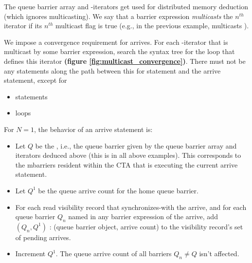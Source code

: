 The queue barrier array and -iterators get used for distributed memory deduction (which ignores multicasting).
We say that a barrier expression \textit{multicasts} the $n^{th}$ iterator if its $n^{th}$ multicast flag is true (e.g., in the previous example,  multicasts ).

\begin{figure*}[!b]

\caption{Illustration of mbarrier multicast convergence requirements} \label{fig:multicast_convergence}
\end{figure*}

\filbreak
{}

We impose a convergence requirement for arrives.
For each -iterator that is multicast by some barrier expression, search the syntax tree for the  loop that defines this iterator \textbf{(figure \ref{fig:multicast_convergence})}.
There must not be any statements along the path between this for statement and the arrive statement, except for
\begin{itemize}
  \item {} statements
  \filbreak
  \item {} loops
\end{itemize}

\filbreak
For $N=1$, the behavior of an arrive statement is:
\begin{itemize}
  \item Let $Q$ be the , i.e., the queue barrier given by the queue barrier array and iterators deduced above (this is  in all above examples).
    This corresponds to the mbarriers resident within the CTA that is executing the current arrive statement.
  \filbreak
  \item Let $Q^1$ be the queue arrive count for the home queue barrier.
  \filbreak
  \item For each read visibility record that synchronizes-with the arrive, and for each queue barrier $Q_n$ named in any barrier expression of the arrive, add $(Q_n, Q^1)$ : (queue barrier object, arrive count) to the visibility record's set of pending arrives.
  \filbreak
  \item Increment $Q^1$.
    The queue arrive count of all barriers $Q_n \ne Q$ isn't affected.
\end{itemize}

